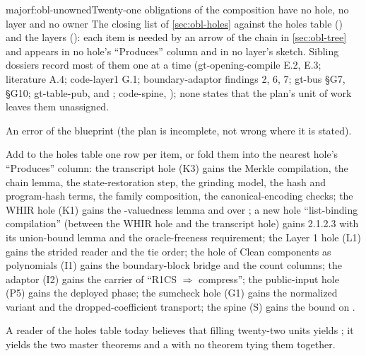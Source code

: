 \begin{finding}{major}{f:obl-unowned}{Twenty-one obligations of the composition have no hole, no layer and no owner}
 The closing list of \cref{sec:obl-holes} against the holes table () and the layers (): each item is needed by an arrow of the chain in \cref{sec:obl-tree} and appears in no hole's ``Produces'' column and in no layer's sketch. Sibling dossiers record most of them one at a time (gt-opening-compile E.2, E.3; literature A.4; code-layer1 G.1; boundary-adaptor findings 2, 6, 7; gt-bus §G7, §G10; gt-table-pub,  and ; code-spine, ); none states that the plan's unit of work leaves them unassigned.

 An error of the blueprint (the plan is incomplete, not wrong where it is stated).

 Add to the holes table one row per item, or fold them into the nearest hole's ``Produces'' column: the transcript hole (K3) gains the Merkle compilation, the chain lemma, the state-restoration step, the grinding model, the hash and program-hash terms, the family composition, the canonical-encoding checks; the WHIR hole (K1) gains the -valuedness lemma and  over ; a new hole ``list-binding compilation'' (between the WHIR hole and the transcript hole) gains 2.1.2.3 with its union-bound lemma and the oracle-freeness requirement; the Layer 1 hole (L1) gains the strided reader and the tie order; the hole of Clean components as polynomials (I1) gains the boundary-block bridge and the count columns; the adaptor (I2) gains the carrier of ``R1CS \ensuremath{\Rightarrow} compress''; the public-input hole (P5) gains the deployed phase; the sumcheck hole (G1) gains the normalized variant and the dropped-coefficient transport; the spine (S) gains the bound on .

 A reader of the holes table today believes that filling twenty-two units yields ; it yields the two master theorems and a  with no theorem tying them together.

\end{finding}

